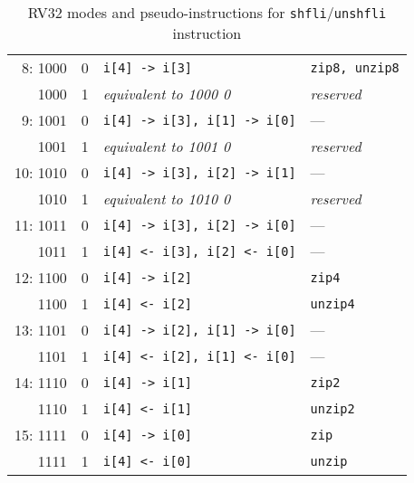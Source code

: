 \begin{table}[h]
\begin{small}
\begin{center}
\begin{tabular}{r c l l}
 8: 1000 & 0 & {\tt i[4] -> i[3]}               & {\tt zip8, unzip8}     \\
    1000 & 1 & {\it equivalent to 1000 0}       & {\it reserved}         \\
 9: 1001 & 0 & {\tt i[4] -> i[3], i[1] -> i[0]} & ---                    \\
    1001 & 1 & {\it equivalent to 1001 0}       & {\it reserved}         \\
10: 1010 & 0 & {\tt i[4] -> i[3], i[2] -> i[1]} & ---                    \\
    1010 & 1 & {\it equivalent to 1010 0}       & {\it reserved}         \\
11: 1011 & 0 & {\tt i[4] -> i[3], i[2] -> i[0]} & ---                    \\
    1011 & 1 & {\tt i[4] <- i[3], i[2] <- i[0]} & ---                    \\

\hline

12: 1100 & 0 & {\tt i[4] -> i[2]}               & {\tt zip4}             \\
    1100 & 1 & {\tt i[4] <- i[2]}               & {\tt unzip4}           \\
13: 1101 & 0 & {\tt i[4] -> i[2], i[1] -> i[0]} & ---                    \\
    1101 & 1 & {\tt i[4] <- i[2], i[1] <- i[0]} & ---                    \\
14: 1110 & 0 & {\tt i[4] -> i[1]}               & {\tt zip2}             \\
    1110 & 1 & {\tt i[4] <- i[1]}               & {\tt unzip2}           \\
15: 1111 & 0 & {\tt i[4] -> i[0]}               & {\tt zip}              \\
    1111 & 1 & {\tt i[4] <- i[0]}               & {\tt unzip}            \\

\end{tabular}
\end{center}
\end{small}
\caption{RV32 modes and pseudo-instructions for {\tt shfli}/{\tt unshfli} instruction}
\label{gzip32-modes}
\end{table}

